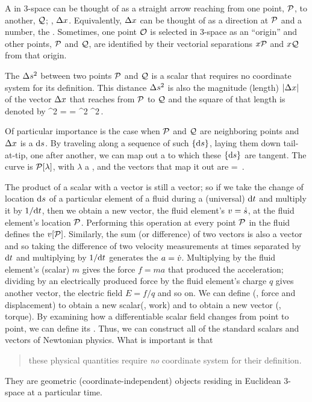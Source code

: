 A  in 3-space can be thought of as a straight arrow reaching from one point, $\mathcal{P}$, to another, $\mathcal{Q}$; \ie, $\Delta x$. Equivalently, $\Delta x$ can be thought of as a direction at $\mathcal{P}$ and a number, the . Sometimes, one point $\mathcal{O}$ is selected in 3-space as an ``origin'' and other points, $\mathcal{P}$ and $\mathcal{Q}$, are identified by their vectorial separations $x{\mathcal{P}}$ and $x{\mathcal{Q}}$ from that origin.

The  $\Delta s^2$ between two points $\mathcal{P}$ and $\mathcal{Q}$ is a scalar that requires no coordinate system for its definition. This distance $\Delta s^2$ is also the magnitude (length) $\lvert{\Delta x}\rvert$ of the vector $\Delta x$ that reaches from $\mathcal{P}$ to $\mathcal{Q}$ and the square of that length is denoted by
\beq
\magn{\diff\pvec}^2 = \diff\pvec\diff\pvec = \diff\pvec^2  \diff\svec^2\,.
\eeq

Of particular importance is the case when $\mathcal{P}$ and $\mathcal{Q}$ are neighboring points and $\Delta x$ is a  $\text{d}s$. By traveling along a sequence of such $\left\lbrace{\text{d}s}\right\rbrace$, laying them down tail-at-tip, one after another, we can map out a  to which these $\left\lbrace{\text{d}s}\right\rbrace$ are tangent. The curve is $\mathcal{P}\!\left[{\lambda}\right]$, with $\lambda$ a , and the vectors that map it out are 
\beq
\dx\svec = \dx\lambda\,.
\eeq

The product of a scalar with a vector is still a vector; so if we take the change of location $\text{d}s$ of a particular element of a fluid during a (universal)  $\text{d} t$ and multiply it by $1/\text{d} t$, then we obtain a new vector, the fluid element's  $v = \dot{s}$, at the fluid element's location $\mathcal{P}$. Performing this operation at every point $\mathcal{P}$ in the fluid defines the  $v\!\left[{\mathcal{P}}\right]$. Similarly, the sum (or difference) of two vectors is also a vector and so taking the difference of two velocity measurements at times separated by $\text{d} t$ and multiplying by $1/\text{d} t$ generates the  $a = \dot{v}$. Multiplying by the fluid element's (scalar)  $m$ gives the force $f = ma$ that produced the acceleration; dividing by an electrically produced force by the fluid element's charge $q$ gives another vector, the electric field $E = f/q$ and so on. We can define  (\eg, force and displacement) to obtain a new scalar(\eg, work) and  to obtain a new vector (\eg, torque). By examining how a differentiable scalar field changes from point to point, we can define its . Thus, we can construct all of the standard scalars and vectors of Newtonian physics. What is important is that
\begin{quote}
these physical quantities require \emph{no} coordinate system for their definition.
\end{quote}
They are geometric (coordinate-independent) objects residing in Euclidean 3-space at a particular time.

